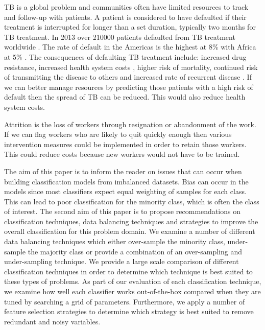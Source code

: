 \documentclass{sig-alternate-05-2015}
\begin{document}
	TB is a global problem and communities often have limited resources to track and follow-up with patients. A patient is considered to have defaulted if their treatment is interrupted for longer than a set duration, typically two months for TB treatment. In 2013 over 210\hspace*{1mm}000 patients defaulted from TB treatment worldwide \cite{world2015TB}. The rate of default in the Americas is the highest at 8\% with Africa at 5\% \cite{world2015TB}. The consequences of defaulting TB treatment include: increased drug resistance, increased health system costs \cite{Lackey:10356751520150601, muture:6660173120110101}, higher risk of mortality, continued risk of transmitting the disease to others \cite{Lackey:10356751520150601} and increased rate of recurrent disease \cite{Jha:10.1371/journal.pone.0008873}. If we can better manage resources by predicting those patients with a high risk of default then the spread of TB can be reduced. This would also reduce health system costs.
	
	Attrition is the loss of workers through resignation or abandonment of the work. If we can flag workers who are likely to quit quickly enough then various intervention measures could be implemented in order to retain those workers. This could reduce costs because new workers would not have to be trained.
	
	The aim of this paper is to inform the reader on issues that can occur when building classification models from imbalanced datasets. Bias can occur in the models since most classifiers expect equal weighting of samples for each class. This can lead to poor classification for the minority class, which is often the class of interest. The second aim of this paper is to propose recommendations on classification techniques, data balancing techniques and strategies to improve the overall classification for this problem domain. We examine a number of different data balancing techniques which either over-sample the minority class, under-sample the majority class or provide a combination of an over-sampling and under-sampling technique. We provide a large scale comparison of different classification techniques in order to determine which technique is best suited to these types of problems. As part of our evaluation of each classification technique, we examine how well each classifier works out-of-the-box compared when they are tuned by searching a grid of parameters. Furthermore, we apply a number of feature selection strategies to determine which strategy is best suited to remove redundant and noisy variables.
	
\end{document}
